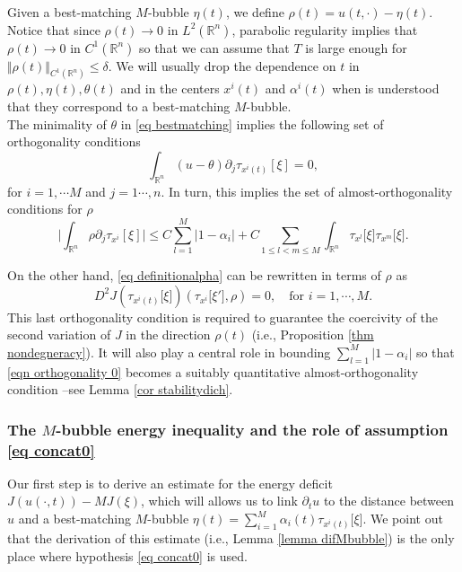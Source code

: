 \documentclass[11pt,letterpaper,reqno]{amsart}
\newcommand{\R}{\mathbb{R}}
\theoremstyle{plain}%
\theoremstyle{definition}
\numberwithin{equation}{section}
\numberwithin{figure}{section}
\begin{document}
Given a best-matching $M$-bubble $\eta(t)$, we define $\rho(t) = u(t, \cdot)- \eta(t)$. Notice that since $\rho(t) \to 0$ in $L^2(\R^n)$, parabolic regularity implies that $\rho(t) \to 0$ in $C^1(\R^n)$ so that we can assume that $T$ is large enough for $\Vert \rho(t)\Vert_{C^1(\R^n)} \leq \delta$. We will usually drop the dependence on $t$ in $\rho(t), \eta(t), \theta(t)$ and in the centers $x^i(t)$ and $\alpha^i(t)$ when is understood that they correspond to a best-matching $M$-bubble.\\

The minimality of $\theta$ in \eqref{eq bestmatching} implies the following set of orthogonality conditions
	\begin{equation}\label{eqn orthogonality 0}
		\int_{\R^n} (u-\theta) \partial_j \tau_{x^i(t)}[\xi]=0,
	\end{equation}
 for $i=1,\cdots M$ and $j=1\cdots, n$. In turn, this implies the set of almost-orthogonality conditions for $\rho$
 \begin{equation}\label{eqn orthogonality 0}
		\Bigg|\int_{\R^n} \rho \partial_j \tau_{x^i}[\xi]\Bigg|\leq C\sum_{l=1}^M|1-\alpha_i| +C\sum_{1\leq l< m \leq M}\int_{\R^n} \tau_{x^l}\big[\xi\big] \tau_{x^m}\big[\xi\big].
	\end{equation}
 
 On the other hand, \eqref{eq definitionalpha} can be rewritten in terms of $\rho$ as
 \begin{equation}\label{eq orthpxi} 
 D^2J(\tau_{x^i(t)}\big[\xi\big]) (\tau_{x^i}\big[\xi'\big],\rho)=0, \quad \mbox{for $i=1,\cdots, M$}.
\end{equation}
This last orthogonality condition is required to guarantee the coercivity of the second variation of $J$ in the direction $\rho(t)$ (i.e., Proposition \ref{thm nondegneracy}). It will also play a central role in bounding $\sum_{l=1}^M|1-\alpha_i|$ so that \eqref{eqn orthogonality 0} becomes a suitably quantitative almost-orthogonality condition --see Lemma \ref{cor stabilitydich}.

 
\subsubsection{The $M$-bubble energy inequality and the role of assumption \eqref{eq concat0}}

Our first step is to derive an estimate for the energy deficit $J(u(\cdot, t)) -M J(\xi)$, which will allows us to link $\partial_t u$ to the distance between $u$ and a best-matching $M$-bubble $\eta(t)=\sum_{i=1}^M \alpha_i(t)\tau_{x^i(t)}\big[\xi\big]$. We point out that the derivation of this estimate (i.e., Lemma \ref{lemma difMbubble}) is the only place where hypothesis \eqref{eq concat0} is used.\\
\end{document}
